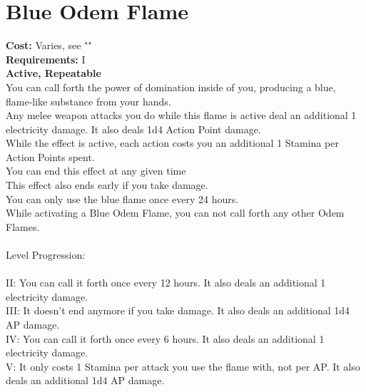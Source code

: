 \section{Blue Odem Flame}\label{perk:blueOdemFlame}
\textbf{Cost:} Varies, see ""\\
\textbf{Requirements:} I\\
\textbf{Active, Repeatable}\\
You can call forth the power of domination inside of you, producing a blue, flame-like substance from your hands.\\
Any melee weapon attacks you do while this flame is active deal an additional 1 electricity damage.
It also deals 1d4 Action Point damage.\\
While the effect is active, each action costs you an additional 1 Stamina per Action Points spent.\\
You can end this effect at any given time\\
This effect also ends early if you take damage.\\
You can only use the blue flame once every 24 hours.\\
While activating a Blue Odem Flame, you can not call forth any other Odem Flames.\\
\\
Level Progression:\\
\\
II: You can call it forth once every 12 hours.
It also deals an additional 1 electricity damage.\\
III: It doesn't end anymore if you take damage.
It also deals an additional 1d4 AP damage.\\
IV: You can call it forth once every 6 hours.
It also deals an additional 1 electricity damage.\\
V: It only costs 1 Stamina per attack you use the flame with, not per AP.
It also deals an additional 1d4 AP damage.\\